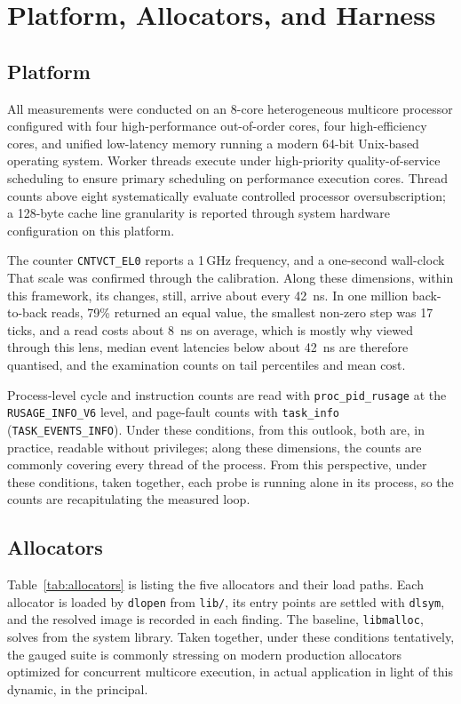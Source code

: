 \section{Platform, Allocators, and Harness}
\label{sec:platform}
\subsection{Platform}
All measurements were conducted on an 8-core heterogeneous multicore processor configured with four high-performance out-of-order cores, four high-efficiency cores, and unified low-latency memory running a modern 64-bit Unix-based operating system. Worker threads execute under high-priority quality-of-service scheduling to ensure primary scheduling on performance execution cores. Thread counts above eight systematically evaluate controlled processor oversubscription; a 128-byte cache line granularity is reported through system hardware configuration on this platform.

The counter \texttt{CNTVCT\_EL0} reports a 1\,GHz frequency, and a one-second wall-clock
That scale was confirmed through the calibration. Along these dimensions, within this framework, its changes, still, arrive about every 42~ns. In one
million back-to-back reads, 79\% returned an equal value, the smallest non-zero step was
17 ticks, and a read costs about 8~ns on average, which is mostly why viewed through this lens, median event latencies below about 42~ns
are therefore quantised, and the examination counts on tail percentiles and mean cost.

Process-level cycle and instruction counts are read with \texttt{proc\_pid\_rusage} at the
\texttt{RUSAGE\_INFO\_V6} level, and page-fault counts with \texttt{task\_info}
(\texttt{TASK\_EVENTS\_INFO}). Under these conditions, from this outlook, both are, in practice, readable without privileges; along these dimensions, the counts are commonly covering every
thread of the process. From this perspective, under these conditions, taken together, each probe is running alone in its process, so the counts are recapitulating the
measured loop.

\subsection{Allocators}
Table~\ref{tab:allocators} is listing the five allocators and their load paths. Each allocator
is loaded by \texttt{dlopen} from \texttt{lib/}, its entry points are settled with
\texttt{dlsym}, and the resolved image is recorded in each finding. The baseline,
\texttt{libmalloc}, solves from the system library. Taken together, under these conditions tentatively, the gauged suite is commonly stressing on modern production allocators optimized for concurrent multicore execution, in actual application in light of this dynamic, in the principal.


